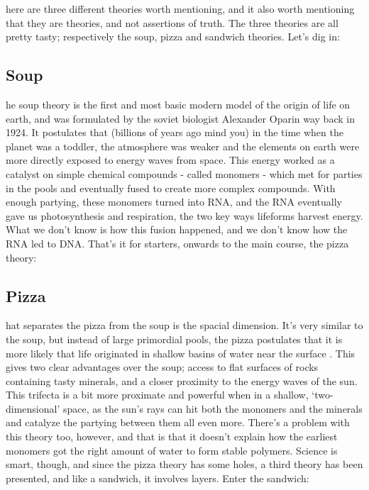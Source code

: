 here are three different theories worth mentioning, and it also worth mentioning that they are theories, and not assertions of truth. The three theories are all pretty tasty; respectively the soup, pizza and sandwich theories. Let’s dig in:

\subsection*{Soup}
he soup theory is the first and most basic modern model of the origin of life on earth, and was formulated by the soviet biologist Alexander Oparin way back in 1924. It postulates \cite{shapiro} that (billions of years ago mind you) in the time when the planet was a toddler, the atmosphere was weaker and the elements on earth were more directly exposed to energy waves from space. This energy worked as a catalyst on simple chemical compounds - called monomers - which met for parties in the pools and eventually fused to create more complex compounds. With enough partying, these monomers turned into RNA, and the RNA eventually gave us photosynthesis and respiration, the two key ways lifeforms harvest energy. What we don’t know is how this fusion happened, and we don’t know how the RNA led to DNA. That’s it for starters, onwards to the main course, the pizza theory: 

\subsection*{Pizza}
hat separates the pizza from the soup is the spacial dimension. It’s very similar to the soup, but instead of large primordial pools, the pizza postulates that it is more likely that life originated in shallow basins of water near the surface \cite{Exoboken}. This gives two clear advantages over the soup; access to flat surfaces of rocks containing tasty minerals, and a closer proximity to the energy waves of the sun. This trifecta is a bit more proximate and powerful when in a shallow, ‘two-dimensional’ space, as the sun’s rays can hit both the monomers and the minerals and catalyze the partying between them all even more. There’s a problem with this theory too, however, and that is that it doesn’t explain how the earliest monomers got the right amount of water to form stable polymers. Science is smart, though, and since the pizza theory has some holes, a third theory has been presented, and like a sandwich, it involves layers. Enter the sandwich:

